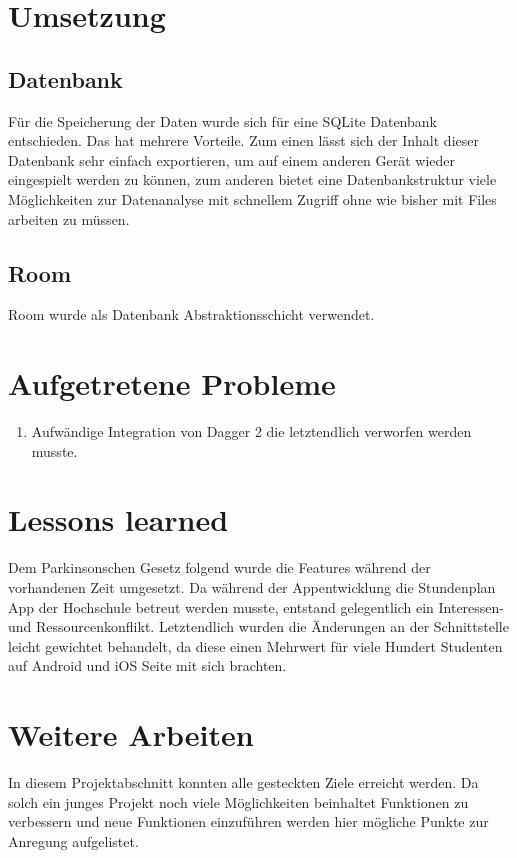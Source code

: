 \documentclass[
    DIV12,
    cleardouble=plain,
    headings=normal,
    pdftex,
    headexclude,footexclude,
    final
]{scrreprt}
\begin{document}
\newpage

\chapter{Umsetzung}
\section{Datenbank}
Für die Speicherung der Daten wurde sich für eine SQLite Datenbank entschieden. Das hat mehrere Vorteile. Zum einen lässt sich der Inhalt dieser Datenbank sehr einfach exportieren, um auf einem anderen Gerät wieder eingespielt werden zu können, zum anderen bietet eine Datenbankstruktur viele Möglichkeiten zur Datenanalyse mit schnellem Zugriff ohne wie bisher mit Files arbeiten zu müssen.

\section{Room}
Room wurde als Datenbank Abstraktionsschicht verwendet.



\newpage

\chapter{Aufgetretene Probleme}


\begin{enumerate}
\item Aufwändige Integration von Dagger 2 die letztendlich verworfen werden musste.
\end{enumerate}

\newpage

\chapter{Lessons learned}
Dem Parkinsonschen Gesetz folgend wurde die Features während der vorhandenen Zeit umgesetzt. Da während der Appentwicklung die Stundenplan App der Hochschule betreut werden musste, entstand gelegentlich ein Interessen- und Ressourcenkonflikt. Letztendlich wurden die Änderungen an der Schnittstelle leicht gewichtet behandelt, da diese einen Mehrwert für viele Hundert Studenten auf Android und iOS Seite mit sich brachten.



\newpage

\chapter{Weitere Arbeiten}
In diesem Projektabschnitt konnten alle gesteckten Ziele erreicht werden. Da solch ein junges Projekt noch viele Möglichkeiten beinhaltet Funktionen zu verbessern und neue Funktionen einzuführen werden hier mögliche Punkte zur Anregung aufgelistet.




\newpage


\listoffigures
\end{document}
